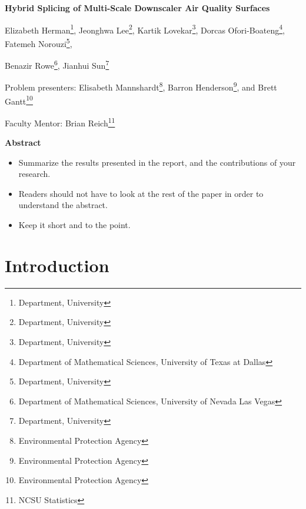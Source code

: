 \documentclass[10pt]{article}
\begin{document}
\centerline{\large \bf Hybrid Splicing of Multi-Scale Downscaler Air Quality Surfaces}

\vspace{.1truein}

\def\thefootnote{\arabic{footnote}}
\begin{center}
  Elizabeth Herman\footnote{Department, University},
  Jeonghwa Lee\footnote{Department, University},
  Kartik Lovekar\footnote{Department, University},
  Dorcas Ofori-Boateng\footnote{Department of Mathematical Sciences, University of Texas at Dallas},
  Fatemeh Norouzi\footnote{Department, University},
  
  Benazir Rowe\footnote{Department of Mathematical Sciences, University of Nevada Las Vegas},
  Jianhui Sun\footnote{Department, University}
\end{center}


\begin{center}
Problem presenters: Elisabeth Mannshardt\footnote{Environmental Protection Agency}, Barron Henderson\footnote{Environmental Protection Agency}, and Brett Gantt\footnote{Environmental Protection Agency}

 
Faculty Mentor: Brian Reich\footnote{NCSU Statistics}
\end{center}


\vspace{.3truein}
\centerline{\bf Abstract}

\begin{itemize}
\item Summarize the results presented in the report, and the contributions
of your research.

\item Readers should not have to look at the rest of the paper in order to 
understand the abstract.

\item Keep it short and to the point.
\end{itemize}


\section{Introduction}
\end{document}
